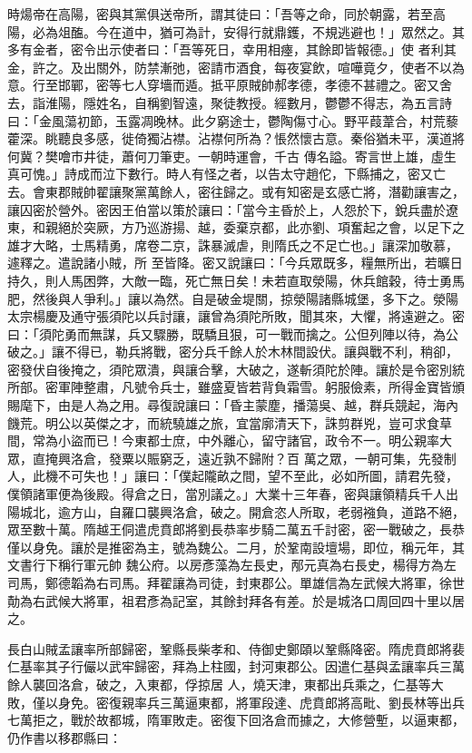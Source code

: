\begin{pinyinscope}
 時煬帝在高陽，密與其黨俱送帝所，謂其徒曰：「吾等之命，同於朝露，若至高陽，必為俎醢。今在道中，猶可為計，安得行就鼎鑊，不規逃避也！」眾然之。其多有金者，密令出示使者曰：「吾等死日，幸用相瘞，其餘即皆報德。」使
 者利其金，許之。及出關外，防禁漸弛，密請市酒食，每夜宴飲，喧嘩竟夕，使者不以為意。行至邯鄲，密等七人穿墻而遁。抵平原賊帥郝孝德，孝德不甚禮之。密又舍去，詣淮陽，隱姓名，自稱劉智遠，聚徒教授。經數月，鬱鬱不得志，為五言詩曰：「金風蕩初節，玉露凋晚林。此夕窮途士，鬱陶傷寸心。野平葭葦合，村荒藜藿深。眺聽良多感，徙倚獨沾襟。沾襟何所為？悵然懷古意。秦俗猶未平，漢道將何冀？樊噲市井徒，蕭何刀筆吏。一朝時運會，千古
 傳名謚。寄言世上雄，虛生真可愧。」詩成而泣下數行。時人有怪之者，以告太守趙佗，下縣捕之，密又亡去。會東郡賊帥翟讓聚黨萬餘人，密往歸之。或有知密是玄感亡將，潛勸讓害之，讓囚密於營外。密因王伯當以策於讓曰：「當今主昏於上，人怨於下，銳兵盡於遼東，和親絕於突厥，方乃巡游揚、越，委棄京都，此亦劉、項奮起之會，以足下之雄才大略，士馬精勇，席卷二京，誅暴滅虐，則隋氏之不足亡也。」讓深加敬慕，遽釋之。遣說諸小賊，所
 至皆降。密又說讓曰：「今兵眾既多，糧無所出，若曠日持久，則人馬困弊，大敵一臨，死亡無日矣！未若直取滎陽，休兵館穀，待士勇馬肥，然後與人爭利。」讓以為然。自是破金堤關，掠滎陽諸縣城堡，多下之。滎陽太宗楊慶及通守張須陀以兵討讓，讓曾為須陀所敗，聞其來，大懼，將遠避之。密曰：「須陀勇而無謀，兵又驟勝，既驕且狠，可一戰而擒之。公但列陣以待，為公破之。」讓不得已，勒兵將戰，密分兵千餘人於木林間設伏。讓與戰不利，稍卻，
 密發伏自後掩之，須陀眾潰，與讓合擊，大破之，遂斬須陀於陣。讓於是令密別統所部。密軍陣整肅，凡號令兵士，雖盛夏皆若背負霜雪。躬服儉素，所得金寶皆頒賜麾下，由是人為之用。尋復說讓曰：「昏主蒙塵，播蕩吳、越，群兵競起，海內饑荒。明公以英傑之才，而統驍雄之旅，宜當廓清天下，誅剪群兇，豈可求食草間，常為小盜而已！今東都士庶，中外離心，留守諸官，政令不一。明公親率大眾，直掩興洛倉，發粟以賑窮乏，遠近孰不歸附？百
 萬之眾，一朝可集，先發制人，此機不可失也！」讓曰：「僕起隴畝之間，望不至此，必如所圖，請君先發，僕領諸軍便為後殿。得倉之日，當別議之。」大業十三年春，密與讓領精兵千人出陽城北，逾方山，自羅口襲興洛倉，破之。開倉恣人所取，老弱襁負，道路不絕，眾至數十萬。隋越王侗遣虎賁郎將劉長恭率步騎二萬五千討密，密一戰破之，長恭僅以身免。讓於是推密為主，號為魏公。二月，於鞏南設壇場，即位，稱元年，其文書行下稱行軍元帥
 魏公府。以房彥藻為左長史，邴元真為右長史，楊得方為左司馬，鄭德韜為右司馬。拜翟讓為司徒，封東郡公。單雄信為左武候大將軍，徐世勣為右武候大將軍，祖君彥為記室，其餘封拜各有差。於是城洛口周回四十里以居之。



 長白山賊孟讓率所部歸密，鞏縣長柴孝和、侍御史鄭頤以鞏縣降密。隋虎賁郎將裴仁基率其子行儼以武牢歸密，拜為上柱國，封河東郡公。因遣仁基與孟讓率兵三萬餘人襲回洛倉，破之，入東都，俘掠居
 人，燒天津，東都出兵乘之，仁基等大敗，僅以身免。密復親率兵三萬逼東都，將軍段達、虎賁郎將高毗、劉長林等出兵七萬拒之，戰於故都城，隋軍敗走。密復下回洛倉而據之，大修營塹，以逼東都，仍作書以移郡縣曰：




\end{pinyinscope}
